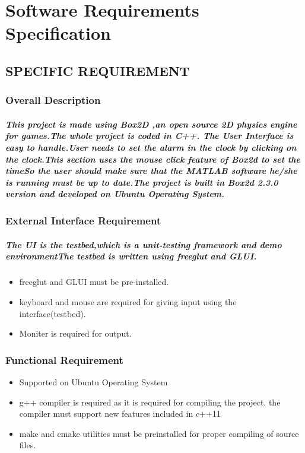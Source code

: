 \chapter{Software Requirements Specification}
\section{SPECIFIC REQUIREMENT}
\subsection{Overall Description}
\paragraph{This project is made using Box2D ,an open source 2D physics engine for games.The whole project is coded in C++.
The  User Interface is easy to handle.User needs to set the alarm in the clock by clicking on the clock.This section uses the mouse click feature of Box2d to set the timeSo the user should make sure that the MATLAB software he/she is running must be up to date.The project is built in Box2d 2.3.0  version and developed on Ubuntu Operating System. }
\subsection{External Interface Requirement}
\paragraph{
The UI is the testbed,which is a unit-testing framework and demo environmentThe testbed is written using freeglut and GLUI.}
\begin{itemize}
 \item{
freeglut and GLUI must be pre-installed.}
 \item{keyboard and mouse are required for giving input using the interface(testbed).}
 \item{Moniter is required for output.}
 \end{itemize}


\subsection{Functional Requirement}
\begin{itemize}
 \item{Supported on Ubuntu Operating System}
 \item{g++ compiler is required as it is required for compiling the project.
the compiler must support new features included in c++11}
 \item{make and cmake utilities must be preinstalled for proper compiling of source files.
}
\end{itemize}